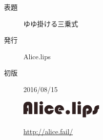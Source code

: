 \documentclass[b5paper,12pt]{jbook}
\begin{document}
\pagestyle{empty}

\clearpage

\vspace*{110mm}
\begin{flushright}
    \begin{minipage}{70mm}
        \begin{screen}
            \begin{description}
                \item[表題] ゆゆ掛ける三乗式
                \item[発行] Alice.lips
                \item[初版] 2016/08/15
                \item[] \hspace*{3mm} \includegraphics[width=41mm, bb=0 0 476 103]{resources/logo.png} \vspace*{-4mm}
                \item[] \hspace*{18mm} \url{http://alice.fail/}
            \end{description}
        \end{screen}
    \end{minipage}
\end{flushright}
\end{document}
